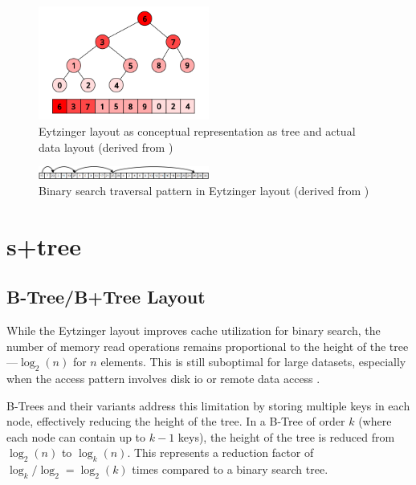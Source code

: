 \begin{figure}[ht]
  \centering
  \includegraphics[width=0.5\textwidth]{figs/related_work_theoretical_bg/eytzinger_layout.png}
  \caption{Eytzinger layout as conceptual representation as tree and actual data layout (derived from \citet{binary_search})}
  \label{fig:eytzinger_layout}
\end{figure}
\begin{figure}[ht]
  \centering
  \includegraphics[width=0.5\textwidth]{figs/related_work_theoretical_bg/eytzinger_layout2.png}
  \caption{Binary search traversal pattern in Eytzinger layout (derived from \citet{binary_search})}
  \label{fig:eytzinger_layout2}
\end{figure}

\section{\texorpdfstring{\ac{s+tree}}{S+tree}}
\label{tb:static_btree}

\subsection{B-Tree/B+Tree Layout}
\label{tb:btree_layout}

While the Eytzinger layout improves cache utilization for binary search, the number of memory read operations remains proportional to the height of the tree—$\log_2(n)$ for $n$ elements. This is still suboptimal for large datasets, especially when the access pattern involves disk \ac{io} or remote data access \citep{static_b_trees}.

B-Trees and their variants address this limitation by storing multiple keys in each node, effectively reducing the height of the tree. In a B-Tree of order $k$ (where each node can contain up to $k-1$ keys), the height of the tree is reduced from $\log_2(n)$ to $\log_k(n)$. This represents a reduction factor of $\log_k/\log_2 = \log_2(k)$ times compared to a binary search tree.

